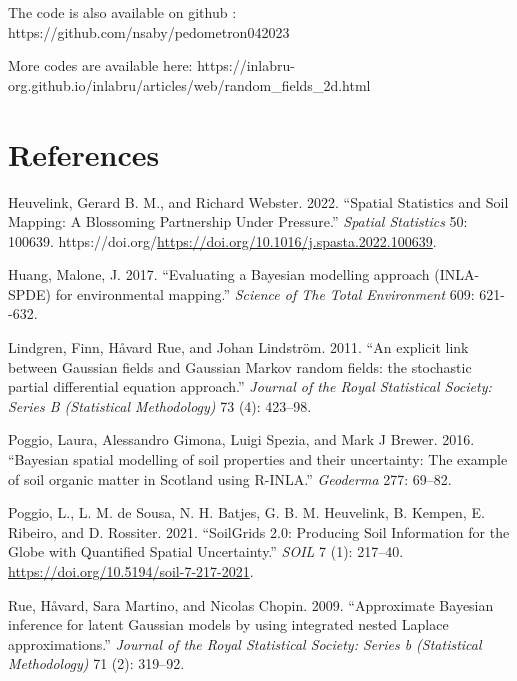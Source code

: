 \documentclass[
  a4paper,
]{article}
\newlength{\cslhangindent}
\newlength{\cslentryspacingunit} %
\newenvironment{CSLReferences}[2] %
 {%
  \setlength{\parindent}{0pt}
  \ifodd #1
  \let\oldpar\par
  \def\par{\hangindent=\cslhangindent\oldpar}
  \fi
  \setlength{\parskip}{#2\cslentryspacingunit}
 }%
 {}
\begin{document}
The code is also available on github :
https://github.com/nsaby/pedometron042023

More codes are available here:
https://inlabru-org.github.io/inlabru/articles/web/random\_fields\_2d.html

\hypertarget{references}{%
\section{References}\label{references}}

\hypertarget{refs}{}
\begin{CSLReferences}{1}{0}
\leavevmode{}%
Heuvelink, Gerard B. M., and Richard Webster. 2022. {``Spatial
Statistics and Soil Mapping: A Blossoming Partnership Under Pressure.''}
\emph{Spatial Statistics} 50: 100639.
https://doi.org/\url{https://doi.org/10.1016/j.spasta.2022.100639}.

\leavevmode{}%
Huang, Malone, J. 2017. {``{Evaluating a Bayesian modelling approach
(INLA-SPDE) for environmental mapping}.''} \emph{Science of The Total
Environment} 609: 621-\/-632.

\leavevmode{}%
Lindgren, Finn, Håvard Rue, and Johan Lindström. 2011. {``{An explicit
link between Gaussian fields and Gaussian Markov random fields: the
stochastic partial differential equation approach}.''} \emph{Journal of
the Royal Statistical Society: Series B (Statistical Methodology)} 73
(4): 423--98.

\leavevmode{}%
Poggio, Laura, Alessandro Gimona, Luigi Spezia, and Mark J Brewer. 2016.
{``{Bayesian spatial modelling of soil properties and their uncertainty:
The example of soil organic matter in Scotland using R-INLA}.''}
\emph{Geoderma} 277: 69--82.

\leavevmode{}%
Poggio, L., L. M. de Sousa, N. H. Batjes, G. B. M. Heuvelink, B. Kempen,
E. Ribeiro, and D. Rossiter. 2021. {``{SoilGrids} 2.0: Producing Soil
Information for the Globe with Quantified Spatial Uncertainty.''}
\emph{SOIL} 7 (1): 217--40.
\url{https://doi.org/10.5194/soil-7-217-2021}.

\leavevmode{}%
Rue, Håvard, Sara Martino, and Nicolas Chopin. 2009. {``{Approximate
Bayesian inference for latent Gaussian models by using integrated nested
Laplace approximations}.''} \emph{Journal of the Royal Statistical
Society: Series b (Statistical Methodology)} 71 (2): 319--92.


\end{CSLReferences}
\end{document}
